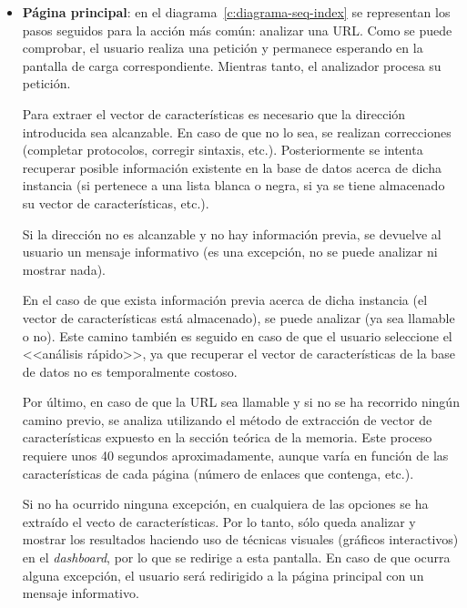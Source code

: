 \noindent
{}

\begin{itemize}
	\item \textbf{Página principal}: en el diagrama~\ref{c:diagrama-seq-index} se representan los pasos seguidos para la acción más común: analizar una URL. Como se puede comprobar, el usuario realiza una petición y permanece esperando en la pantalla de carga correspondiente. Mientras tanto, el analizador procesa su petición.
	
	Para extraer el vector de características es necesario que la dirección introducida sea alcanzable. En caso de que no lo sea, se realizan correcciones (completar protocolos, corregir sintaxis, etc.). Posteriormente se intenta recuperar posible información existente en la base de datos acerca de dicha instancia (si pertenece a una lista blanca o negra, si ya se tiene almacenado su vector de características, etc.).
	
	Si la dirección no es alcanzable y no hay información previa, se devuelve al usuario un mensaje informativo (es una excepción, no se puede analizar ni mostrar nada).
	
	En el caso de que exista información previa acerca de dicha instancia (el vector de características está almacenado), se puede analizar (ya sea llamable o no). Este camino también es seguido en caso de que el usuario seleccione el <<análisis rápido>>, ya que recuperar el vector de características de la base de datos no es temporalmente costoso.
	
	Por último, en caso de que la URL sea llamable y si no se ha recorrido ningún camino previo, se analiza utilizando el método de extracción de vector de características expuesto en la sección teórica de la memoria. Este proceso requiere unos 40 segundos aproximadamente, aunque varía en función de las características de cada página (número de enlaces que contenga, etc.).
	
	Si no ha ocurrido ninguna excepción, en cualquiera de las opciones se ha extraído el vecto de características. Por lo tanto, sólo queda analizar y mostrar los resultados haciendo uso de técnicas visuales (gráficos interactivos) en el \textit{dashboard}, por lo que se redirige a esta pantalla. En caso de que ocurra alguna excepción, el usuario será redirigido a la página principal con un mensaje informativo.


\end{itemize}
